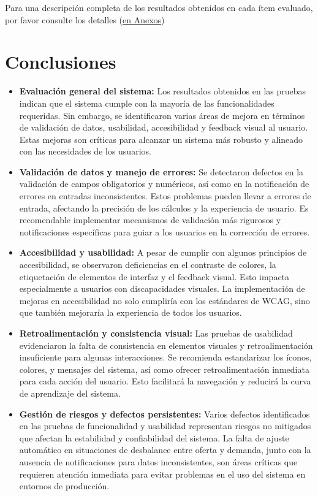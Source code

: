\documentclass[stu, 12pt, letterpaper, donotrepeattitle, floatsintext, natbib]{apa7}
\begin{document}
\noindent Para una descripción completa de los resultados obtenidos en cada ítem evaluado, por favor consulte los detalles (\hyperref[tab:reporte_usabilidad]{en Anexos})


\section{Conclusiones}

\begin{itemize}
    \item \textbf{Evaluación general del sistema:} Los resultados obtenidos en las pruebas indican que el sistema cumple con la mayoría de las funcionalidades requeridas. Sin embargo, se identificaron varias áreas de mejora en términos de validación de datos, usabilidad, accesibilidad y feedback visual al usuario. Estas mejoras son críticas para alcanzar un sistema más robusto y alineado con las necesidades de los usuarios.

    \item \textbf{Validación de datos y manejo de errores:} Se detectaron defectos en la validación de campos obligatorios y numéricos, así como en la notificación de errores en entradas inconsistentes. Estos problemas pueden llevar a errores de entrada, afectando la precisión de los cálculos y la experiencia de usuario. Es recomendable implementar mecanismos de validación más rigurosos y notificaciones específicas para guiar a los usuarios en la corrección de errores.

    \item \textbf{Accesibilidad y usabilidad:} A pesar de cumplir con algunos principios de accesibilidad, se observaron deficiencias en el contraste de colores, la etiquetación de elementos de interfaz y el feedback visual. Esto impacta especialmente a usuarios con discapacidades visuales. La implementación de mejoras en accesibilidad no solo cumpliría con los estándares de WCAG, sino que también mejoraría la experiencia de todos los usuarios.

    \item \textbf{Retroalimentación y consistencia visual:} Las pruebas de usabilidad evidenciaron la falta de consistencia en elementos visuales y retroalimentación insuficiente para algunas interacciones. Se recomienda estandarizar los íconos, colores, y mensajes del sistema, así como ofrecer retroalimentación inmediata para cada acción del usuario. Esto facilitará la navegación y reducirá la curva de aprendizaje del sistema.

    \item \textbf{Gestión de riesgos y defectos persistentes:} Varios defectos identificados en las pruebas de funcionalidad y usabilidad representan riesgos no mitigados que afectan la estabilidad y confiabilidad del sistema. La falta de ajuste automático en situaciones de desbalance entre oferta y demanda, junto con la ausencia de notificaciones para datos inconsistentes, son áreas críticas que requieren atención inmediata para evitar problemas en el uso del sistema en entornos de producción.


\end{itemize}
\end{document}
